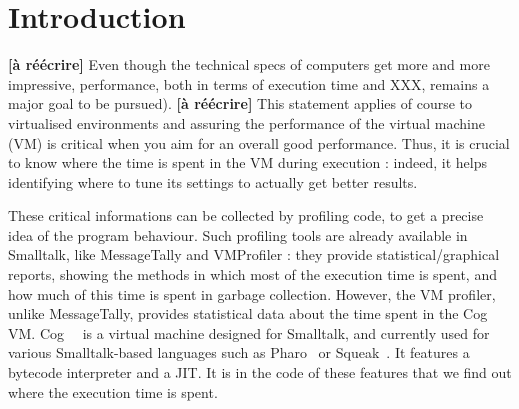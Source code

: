 \documentclass[10pt,preprint]{sigplanconf}
\newcommand{\ct}{\lstinline[backgroundcolor=\color{white},basicstyle=\footnotesize\ttfamily]}
\begin{document}






\section{Introduction}

%
%
%
%
%
%



\textbf{[\`a r\'e\'ecrire]} Even though the technical specs of computers get more and more impressive, performance, both in terms of execution time and XXX, remains a major goal to be pursued). \textbf{[\`a r\'e\'ecrire]}
This statement applies of course to virtualised environments and assuring the performance of the virtual machine (VM) is critical when you aim for an overall good performance. 
Thus, it is crucial to know where the time is spent in the VM during execution : indeed, it helps identifying where to tune its settings to actually get better results.

These critical informations can be collected by profiling code, to get a precise idea of the program behaviour. 
Such profiling tools are already available in Smalltalk, like MessageTally and VMProfiler : they provide statistical/graphical reports, showing the methods in which most of the execution time is spent, and how much of this time is spent in garbage collection. However, the VM profiler, unlike MessageTally, provides statistical data about the time spent in the Cog VM. Cog~\cite{Mira08a}~ is a virtual machine designed for Smalltalk, and currently used for various Smalltalk-based languages such as Pharo~\cite{Blac09a} or Squeak~\cite{Blac07a}. It features a bytecode interpreter and a JIT. It is in the code of these features that we find out where the execution time is spent.\\
\end{document}
